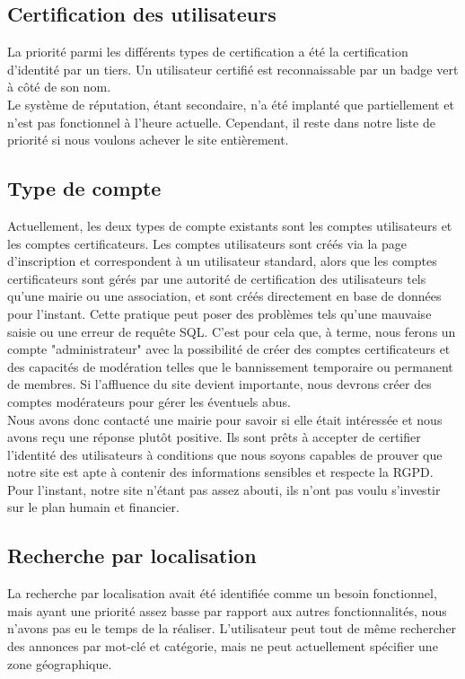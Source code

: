 \documentclass[a4paper,11pt]{article}
\begin{document}
\subsection{Certification des utilisateurs}

La priorité parmi les différents types de certification a été la certification d'identité par un tiers. Un utilisateur certifié est reconnaissable par un badge vert à côté de son nom.\\

Le système de réputation, étant secondaire, n'a été implanté que partiellement et n'est pas fonctionnel à l'heure actuelle. Cependant, il reste dans notre liste de priorité si nous voulons achever le site entièrement.



\subsection{Type de compte}

Actuellement, les deux types de compte existants sont les comptes utilisateurs et les comptes certificateurs. Les comptes utilisateurs sont créés via la page d'inscription et correspondent à un utilisateur standard, alors que les comptes certificateurs sont gérés par une autorité de certification des utilisateurs tels qu'une mairie ou une association, et sont créés directement en base de données pour l'instant. Cette pratique peut poser des problèmes tels qu'une mauvaise saisie ou une erreur de requête SQL. C'est pour cela que, à terme, nous ferons un compte "administrateur" avec la possibilité de créer des comptes certificateurs et des capacités de modération telles que le bannissement temporaire ou permanent de membres.
Si l'affluence du site devient importante, nous devrons créer des comptes modérateurs pour gérer les éventuels abus.\\

Nous avons donc contacté une mairie pour savoir si elle était intéressée et nous avons reçu une réponse plutôt positive. Ils sont prêts à accepter de certifier l'identité des utilisateurs à conditions que nous soyons capables de prouver que notre site est apte à contenir des informations sensibles et respecte la RGPD. Pour l'instant, notre site n'étant pas assez abouti, ils n'ont pas voulu s'investir sur le plan humain et financier.

\subsection{Recherche par localisation}
La recherche par localisation avait été identifiée comme un besoin fonctionnel,
mais ayant une priorité assez basse par rapport aux autres fonctionnalités, nous n'avons
pas eu le temps de la réaliser. L'utilisateur peut tout de même rechercher des annonces par mot-clé
et catégorie, mais ne peut actuellement spécifier une zone géographique.
\end{document}
